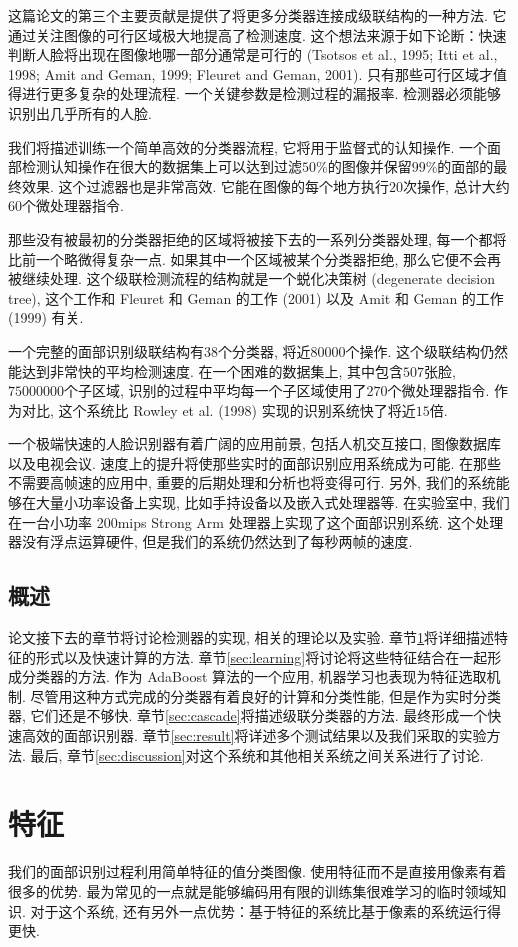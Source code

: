 \documentclass[a4paper,utf8,11pt, onecolumn]{ctexart}
\begin{document}
这篇论文的第三个主要贡献是提供了将更多分类器连接成级联结构的一种方法. 它通过关注图像的可行区域极大地提高了检测速度. 这个想法来源于如下论断：快速判断人脸将出现在图像地哪一部分通常是可行的 (Tsotsos et al., 1995; Itti et al., 1998; Amit and Geman, 1999; Fleuret and Geman, 2001). 
只有那些可行区域才值得进行更多复杂的处理流程. 一个关键参数是检测过程的漏报率. 检测器必须能够识别出几乎所有的人脸. 

我们将描述训练一个简单高效的分类器流程, 它将用于监督式的认知操作. 一个面部检测认知操作在很大的数据集上可以达到过滤$50\%$的图像并保留$99\%$的面部的最终效果. 
这个过滤器也是非常高效. 它能在图像的每个地方执行$20$次操作, 总计大约$60$个微处理器指令. 

那些没有被最初的分类器拒绝的区域将被接下去的一系列分类器处理, 每一个都将比前一个略微得复杂一点. 如果其中一个区域被某个分类器拒绝, 那么它便不会再被继续处理. 这个级联检测流程的结构就是一个蜕化决策树 (degenerate decision tree), 这个工作和 Fleuret 和 Geman 的工作 (2001) 以及 Amit 和 Geman 的工作 (1999) 有关. 

一个完整的面部识别级联结构有$38$个分类器, 将近$80000$个操作. 这个级联结构仍然能达到非常快的平均检测速度. 在一个困难的数据集上, 其中包含$507$张脸, $75000000$个子区域, 识别的过程中平均每一个子区域使用了$270$个微处理器指令. 作为对比, 这个系统比 Rowley et al. (1998) 实现的识别系统快了将近$15$倍. 

一个极端快速的人脸识别器有着广阔的应用前景, 包括人机交互接口, 图像数据库以及电视会议. 速度上的提升将使那些实时的面部识别应用系统成为可能. 在那些不需要高帧速的应用中, 重要的后期处理和分析也将变得可行. 
另外, 我们的系统能够在大量小功率设备上实现, 比如手持设备以及嵌入式处理器等. 在实验室中, 我们在一台小功率 200mips Strong Arm 处理器上实现了这个面部识别系统. 这个处理器没有浮点运算硬件, 但是我们的系统仍然达到了每秒两帧的速度. 
\subsection{概述}
论文接下去的章节将讨论检测器的实现, 相关的理论以及实验. 
章节\ref{sec:feature}将详细描述特征的形式以及快速计算的方法. 章节\ref{sec:learning}将讨论将这些特征结合在一起形成分类器的方法. 作为 AdaBoost 算法的一个应用, 机器学习也表现为特征选取机制. 尽管用这种方式完成的分类器有着良好的计算和分类性能, 但是作为实时分类器, 它们还是不够快. 
章节\ref{sec:cascade}将描述级联分类器的方法. 最终形成一个快速高效的面部识别器. 章节\ref{sec:result}将详述多个测试结果以及我们采取的实验方法. 最后, 章节\ref{sec:discussion}对这个系统和其他相关系统之间关系进行了讨论. 
\section{特征}\label{sec:feature}
我们的面部识别过程利用简单特征的值分类图像. 使用特征而不是直接用像素有着很多的优势. 最为常见的一点就是能够编码用有限的训练集很难学习的临时领域知识. 对于这个系统, 还有另外一点优势：基于特征的系统比基于像素的系统运行得更快. 
\end{document}
